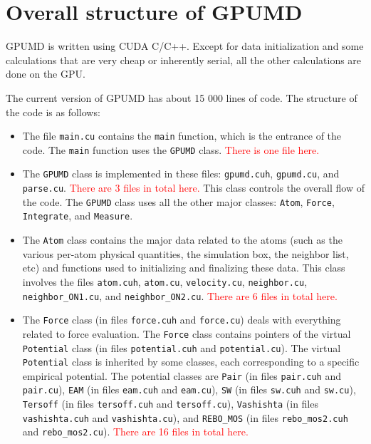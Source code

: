 \documentclass[12pt,a4paper]{report}
\begin{document}
\section{Overall structure of GPUMD}

GPUMD is written using CUDA C/C++. Except for data initialization and some calculations that are very cheap or inherently serial, all the other calculations are done on the GPU.

The current version of GPUMD has about 15 000 lines of code. The structure of the code is as follows:
\begin{itemize}
\item The file \verb"main.cu" contains the \verb"main" function, which is the entrance of the code. The \verb"main" function uses the \verb"GPUMD" class. \textcolor{red}{There is one file here.}


\item The \verb"GPUMD" class is implemented in these files: \verb"gpumd.cuh", \verb"gpumd.cu", and \verb"parse.cu". \textcolor{red}{There are 3 files in total here.} This class controls the overall flow of the code. The \verb"GPUMD" class uses all the other major classes: \verb"Atom", \verb"Force", \verb"Integrate", and \verb"Measure". 

\item The \verb"Atom" class contains the major data related to the atoms (such as the various per-atom physical quantities, the simulation box, the neighbor list, etc) and functions used to initializing and finalizing these data. This class involves the files \verb"atom.cuh", \verb"atom.cu", \verb"velocity.cu", \verb"neighbor.cu", \verb"neighbor_ON1.cu", and \verb"neighbor_ON2.cu". \textcolor{red}{There are 6 files in total here.}

\item The \verb"Force" class (in files \verb"force.cuh" and \verb"force.cu") deals with everything related to force evaluation. The \verb"Force" class contains pointers of the virtual \verb"Potential" class (in files \verb"potential.cuh" and \verb"potential.cu"). The virtual \verb"Potential" class is inherited by some classes, each corresponding to a specific empirical potential. The potential classes are \verb"Pair" (in files \verb"pair.cuh" and \verb"pair.cu"), \verb"EAM" (in files \verb"eam.cuh" and \verb"eam.cu"), \verb"SW" (in files \verb"sw.cuh" and \verb"sw.cu"), \verb"Tersoff" (in files \verb"tersoff.cuh" and \verb"tersoff.cu"), \verb"Vashishta" (in files \verb"vashishta.cuh" and \verb"vashishta.cu"), and \verb"REBO_MOS" (in files \verb"rebo_mos2.cuh" and \verb"rebo_mos2.cu"). \textcolor{red}{There are 16 files in total here.}


\end{itemize}
\end{document}
